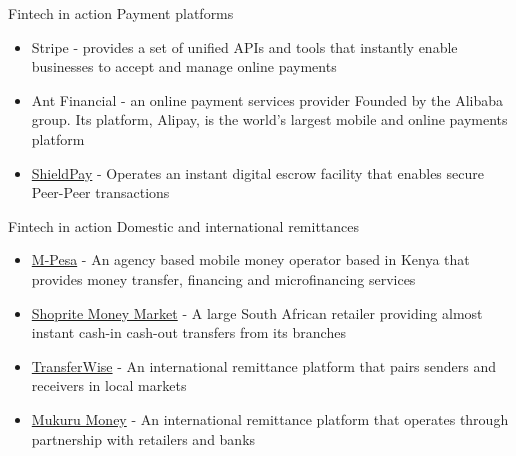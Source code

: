 \documentclass[9pt]{beamer}
\begin{document}
\begin{frame}{Fintech in action}
	Payment platforms
	\begin{itemize}
		\item Stripe - provides a set of unified APIs and tools that instantly enable businesses to accept and manage online payments
		\item Ant Financial - an online payment services provider Founded by the Alibaba group. Its platform, Alipay, is the world's largest mobile and online payments platform
		\item \href{https://www.shieldpay.com/}{ShieldPay} - Operates an instant digital escrow facility that enables secure Peer-Peer transactions
	\end{itemize}
\end{frame}


\begin{frame}{Fintech in action}
	Domestic and international remittances
	\begin{itemize}
		\item \href{https://www.safaricom.co.ke/personal/m-pesa}{M-Pesa} - An agency based mobile money operator based in Kenya that provides money transfer, financing and microfinancing services
		\item \href{https://www.shoprite.co.za/money-market/money-transfers.html}{Shoprite Money Market} - A large South African retailer providing almost instant cash-in cash-out transfers from its branches
		\item \href{https://transferwise.com/}{TransferWise} - An international remittance platform that pairs senders and receivers in local markets
		\item \href{http://sa.mukuru.com}{Mukuru Money} - An international remittance platform that operates through partnership with retailers and banks
	\end{itemize}
\end{frame}

\end{document}
